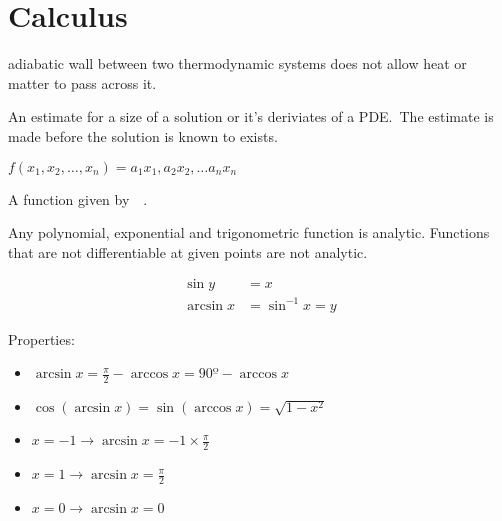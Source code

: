 \section{Calculus}

\begin{definition}[Adiabatic]
    adiabatic wall between two thermodynamic systems does not allow heat or
    matter to pass across it. 

\end{definition}

\begin{definition}
    An estimate for a size of a solution or it's deriviates of a PDE.\
    The estimate is made before the solution is known to exists.

\end{definition}

\begin{definition}[Affine]
    $ 
    f(x_{1}, x_{2}, \dots, x_{n}) = 
    a_{1}x_{1}, a_{2}x_{2}, \dots a_{n}x_{n}
    $
\end{definition}

\begin{definition}
    A function given by~~.
    
    Any polynomial, exponential and trigonometric function is analytic.
    Functions that are not differentiable at given points are not analytic.

\end{definition}

\begin{definition}[arcsin]
    \begin{align*}
        \sin{y} &= x \\
        \arcsin{x} &= \sin^{-1}{x} = y
    \end{align*}

    Properties:
    \begin{itemize}
        \item $\arcsin{x} = \frac{\pi}{2} - \arccos{x} = 90º - \arccos{x}$
        \item $\cos{(\arcsin{x})} = \sin{(\arccos{x})} = \sqrt{1-x^{2}}$
        \item $ x = -1 \rightarrow \arcsin{x} = -1\times\frac{\pi}{2}$
        \item $ x = 1 \rightarrow \arcsin{x} = \frac{\pi}{2}$
        \item $ x = 0 \rightarrow \arcsin{x} = 0$
    \end{itemize}
\end{definition}

